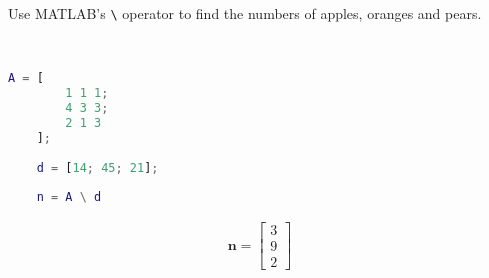 Use MATLAB’s \texttt{\textbackslash} operator to find the numbers of apples, oranges and pears.

\begin{solution} \
    \begin{lstlisting}[language=Matlab]
    A = [
        1 1 1;
        4 3 3;
        2 1 3
    ];
    
    d = [14; 45; 21];
    
    n = A \ d
    \end{lstlisting}
    
    \begin{align*}
        \boldsymbol{n} = \begin{bmatrix}
            3 \\ 9 \\ 2
        \end{bmatrix}
    \end{align*}
\end{solution}